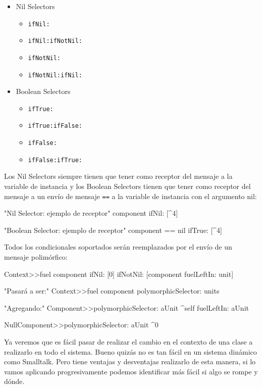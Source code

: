 \begin{itemize}
    \item Nil Selectors
    \begin{itemize}
        \item \lstinline{ifNil:}
        \item \lstinline{ifNil:ifNotNil:}
        \item \lstinline{ifNotNil:}
        \item \lstinline{ifNotNil:ifNil:}
    \end{itemize}

    \item Boolean Selectors
    \begin{itemize}
        \item \lstinline{ifTrue:}
        \item \lstinline{ifTrue:ifFalse:}
        \item \lstinline{ifFalse:}
        \item \lstinline{ifFalse:ifTrue:}
    \end{itemize}
\end{itemize}

Los Nil Selectors siempre tienen que tener como receptor del mensaje a la variable de instancia y los
Boolean Selectors tienen que tener como receptor del mensaje a un envío de mensaje \lstinline{==} a la
variable de instancia con el argumento nil:

\begin{code}
"Nil Selector: ejemplo de receptor"
component ifNil: [^4]    

"Boolean Selector: ejemplo de receptor"
component == nil ifTrue: [^4]    
\end{code}

Todos los condicionales soportados serán reemplazados por el envío de un mensaje polimórfico:

\begin{code}
Context>>fuel
    component ifNil: [0] ifNotNil: [component fuelLeftIn: unit]

"Pasará a ser:"
Context>>fuel
    component polymorphicSelector: units

"Agregando:"
Component>>polymorphicSelector: aUnit
    ^self fuelLeftIn: aUnit

NullComponent>>polymorphicSelector: aUnit
    ^0
\end{code}




Ya veremos que es fácil pasar de realizar el cambio en el contexto de una clase a realizarlo en todo el sistema.
Bueno quizás no es tan fácil en un sistema dinámico como Smalltalk. Pero tiene ventajas y desventajas realizarlo
de esta manera, si lo vamos aplicando progresivamente podemos identificar más fácil si algo se rompe y dónde.


